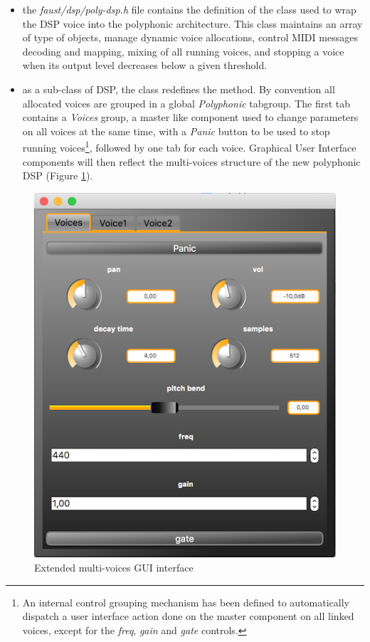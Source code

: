 \begin{itemize}

\item  the \textit{faust/dsp/poly-dsp.h} file contains the definition of the  class used to wrap the DSP voice into the polyphonic architecture. This class maintains an array of   type of objects, manage dynamic voice allocations, control MIDI messages decoding and mapping, mixing of all running voices, and stopping a voice when its output level decreases below a given threshold.

\item as a sub-class of DSP, the   class redefines the  method. By convention all allocated voices are grouped in a global  \textit{Polyphonic} tabgroup. The first tab contains a \textit{Voices} group, a master like component used to change parameters on all voices at the same time, with a \textit{Panic} button to be used to stop running voices\footnote{An internal control grouping mechanism has been defined to automatically dispatch a user interface action done on the master component on all linked voices, except for the  \textit{freq}, \textit{gain} and \textit{gate} controls.}, followed by one tab for each voice. Graphical User Interface components will then reflect the multi-voices structure of the new polyphonic DSP (Figure \ref{fig:poly-ui}). 

 \end{itemize}
 
\begin{figure}[!ht]
\begin{center}
\includegraphics[width=0.6\columnwidth]{images/poly_ui}
\caption{\footnotesize Extended multi-voices GUI interface}
\label{fig:poly-ui}
\end{center}
\end{figure}

